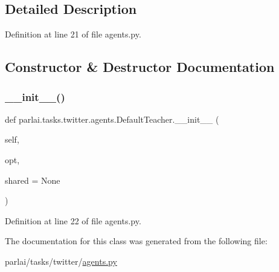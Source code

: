 \subsection{Detailed Description}


Definition at line 21 of file agents.\+py.



\subsection{Constructor \& Destructor Documentation}
\mbox{\label{classparlai_1_1tasks_1_1twitter_1_1agents_1_1DefaultTeacher_a6351654c7d50fa7c723a2d38bd00d0d8}} 
\subsubsection{\texorpdfstring{\+\_\+\+\_\+init\+\_\+\+\_\+()}{\_\_init\_\_()}}
{\footnotesize\ttfamily def parlai.\+tasks.\+twitter.\+agents.\+Default\+Teacher.\+\_\+\+\_\+init\+\_\+\+\_\+ (\begin{DoxyParamCaption}\item[{}]{self,  }\item[{}]{opt,  }\item[{}]{shared = {\ttfamily None} }\end{DoxyParamCaption})}



Definition at line 22 of file agents.\+py.



The documentation for this class was generated from the following file\+:\begin{DoxyCompactItemize}
\item 
parlai/tasks/twitter/\hyperlink{parlai_2tasks_2twitter_2agents_8py}{agents.\+py}\end{DoxyCompactItemize}

